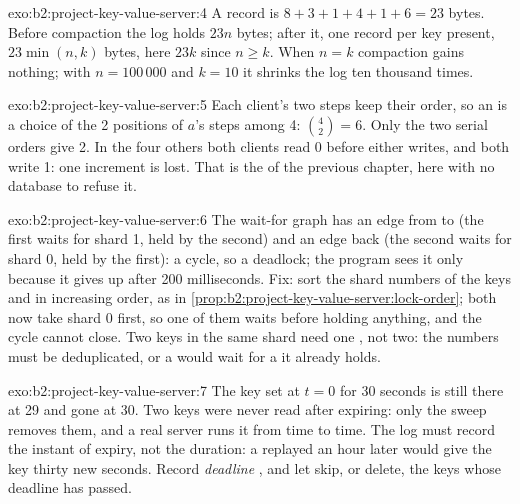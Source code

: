 \begin{solution}{exo:b2:project-key-value-server:4}
A record is $8 + 3 + 1 + 4 + 1 + 6 = 23$ bytes. Before compaction the log holds $23n$ bytes; after it, one record per
key present, $23\min(n, k)$ bytes, here $23k$ since $n \ge k$.
When $n = k$ compaction gains nothing; with $n = 100\,000$ and $k = 10$ it shrinks the log ten thousand times.
\end{solution}

\begin{solution}{exo:b2:project-key-value-server:5}
Each client's two steps keep their order, so an  is a choice of the 2 positions of $a$'s steps among 4:
$\binom{4}{2} = 6$.
Only the two serial orders give 2. In the four others both clients read 0 before either writes, and both write 1: one
increment is lost. That is the  of the previous chapter, here with no database to refuse it.
\end{solution}

\begin{solution}{exo:b2:project-key-value-server:6}
The wait-for graph has an edge from  to  (the first waits for shard 1, held by the second)
and an edge back (the second waits for shard 0, held by the first): a cycle, so a deadlock; the program sees it only
because it gives up after 200 milliseconds. Fix: sort the shard numbers of the keys and  in increasing order, as in
\cref{prop:b2:project-key-value-server:lock-order}; both now take shard 0 first, so one of them waits before holding
anything, and the cycle cannot close. Two keys in the same shard need one , not two: the numbers must be deduplicated,
or a  would wait for a  it already holds.
\end{solution}

\begin{solution}{exo:b2:project-key-value-server:7}
The key set at $t = 0$ for 30 seconds is still there at 29 and gone at 30. Two keys were never read after expiring:
only the sweep removes them, and a real server runs it from time to time. The log must record the instant of expiry, not
the duration: a  replayed an hour later would give the key thirty new seconds. Record
 \emph{deadline} , and let  skip, or delete, the keys whose deadline has passed.
\end{solution}

